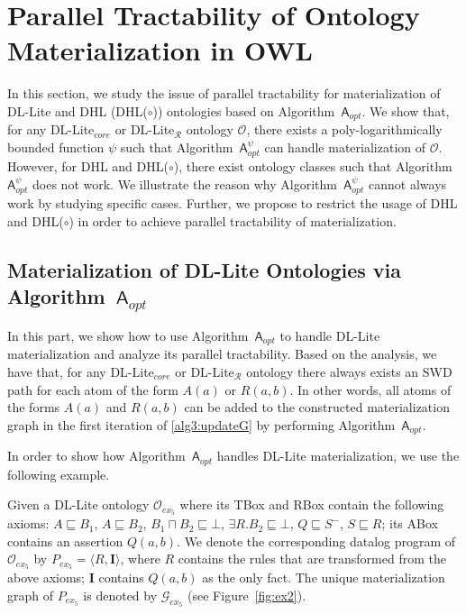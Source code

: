 \section{Parallel Tractability of Ontology Materialization in OWL}
\label{sec:ptonto}

In this section, we study the issue of parallel tractability
for materialization of DL-Lite and DHL (DHL($\circ$)) ontologies
based on Algorithm~$\mathsf{A}_{opt}$.
We show that, for any DL-Lite$_{core}$ or DL-Lite$_\mathcal{R}$ ontology $\mathcal{O}$,
there exists a poly-logarithmically bounded function $\psi$
such that Algorithm~$\mathsf{A}_{opt}^{\psi}$ can handle materialization of $\mathcal{O}$.
However, for DHL and DHL($\circ$), there exist ontology classes such that Algorithm~$\mathsf{A}_{opt}^\psi$
does not work. We illustrate the reason why Algorithm~$\mathsf{A}_{opt}^\psi$ cannot always
work by studying specific cases.
Further, we propose to restrict the usage of DHL and DHL($\circ$) in order to achieve parallel tractability
of materialization.

\subsection{Materialization of DL-Lite Ontologies via Algorithm~$\mathsf{A}_{opt}$}

In this part, we show how to use Algorithm~$\mathsf{A}_{opt}$ to handle
DL-Lite materialization and analyze its parallel tractability.
Based on the analysis, we have that, for any DL-Lite$_{core}$ or DL-Lite$_\mathcal{R}$ ontology
there always exists an SWD path for each atom of the form $A(a)$ or $R(a,b)$.
In other words, all atoms of the forms $A(a)$ and $R(a,b)$ can be added to
the constructed materialization graph in the first iteration of \ref{alg3:updateG}
by performing Algorithm~$\mathsf{A}_{opt}$.

In order to show how Algorithm~$\mathsf{A}_{opt}$ handles DL-Lite materialization,
we use the following example.

\begin{example}\label{exp:dllite}
Given a DL-Lite ontology $\mathcal{O}_{ex_5}$
where its TBox and RBox contain the following axioms:
$A\sqsubseteq B_1$, $A\sqsubseteq B_2$, $B_1\sqcap B_2\sqsubseteq\bot$,
$\exists R.B_2\sqsubseteq\bot$, $Q\sqsubseteq S^-$, $S\sqsubseteq R$;
its ABox contains an assertion $Q(a,b)$.
We denote the corresponding datalog program of $\mathcal{O}_{ex_5}$ by $P_{ex_5}=\langle R, \textbf{I}\rangle$,
where $R$ contains the rules that are transformed from the above axioms; $\textbf{I}$ contains $Q(a,b)$
as the only fact.
The unique materialization graph of $P_{ex_5}$ is denoted by $\mathcal{G}_{ex_5}$ (see Figure~\ref{fig:ex2}).
\end{example}

